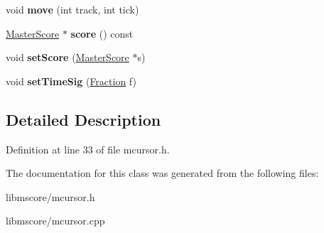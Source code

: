 \begin{DoxyCompactItemize}
void {\bfseries move} (int track, int tick)
\item 
\mbox{\label{class_ms_1_1_m_cursor_a8a9f609c77b69308eba5475051fcd620}} 
\hyperlink{class_ms_1_1_master_score}{Master\+Score} $\ast$ {\bfseries score} () const
\item 
\mbox{\label{class_ms_1_1_m_cursor_ac7bf98cc7bd4c69e30bbc593af54f3e9}} 
void {\bfseries set\+Score} (\hyperlink{class_ms_1_1_master_score}{Master\+Score} $\ast$s)
\item 
\mbox{\label{class_ms_1_1_m_cursor_a9874b5498903eb13400c94842512f339}} 
void {\bfseries set\+Time\+Sig} (\hyperlink{class_ms_1_1_fraction}{Fraction} f)
\end{DoxyCompactItemize}


\subsection{Detailed Description}


Definition at line 33 of file mcursor.\+h.



The documentation for this class was generated from the following files\+:\begin{DoxyCompactItemize}
\item 
libmscore/mcursor.\+h\item 
libmscore/mcursor.\+cpp\end{DoxyCompactItemize}
